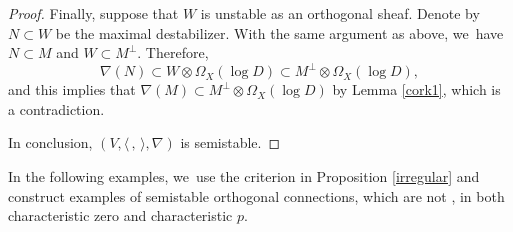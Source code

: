 \begin{proof}
Finally, suppose that $W$ is unstable as an orthogonal sheaf. Denote by $N\subset W$ be the maximal destabilizer. With the same argument as above, we~have $N\subset M$ and $W\subset M^\perp$. Therefore,
\[
\nabla(N)\subset W\otimes \Omega_X(\log D)\subset M^\perp\otimes \Omega_X(\log D),
\]
and this implies that $\nabla(M) \subset M^\perp\otimes\Omega_X(\log D)$ by Lemma \ref{cork1}, which is a contradiction.

In conclusion, $(V, \langle \,, \, \rangle, \nabla)$ is semistable.
\end{proof}

In the following examples, we~use the criterion in Proposition \ref{irregular} and construct examples of semistable orthogonal connections, which are not \grsemistable, in both characteristic zero and characteristic $p$.

